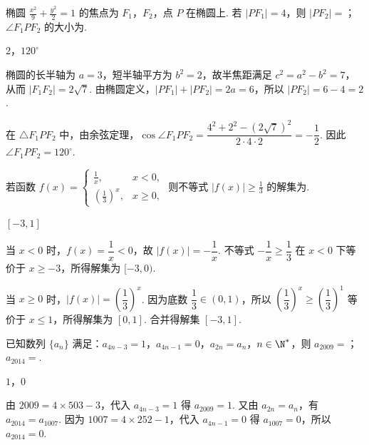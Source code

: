 \begin{problem}
椭圆 \(\frac{x^2}{9} + \frac{y^2}{2} = 1\) 的焦点为 \(F_1\)，\(F_2\)，点 \(P\) 在椭圆上. 若 \(|PF_1| = 4\)，则 \(|PF_2| = \)\fillinblank{}；\(\angle F_1PF_2\) 的大小为\fillinblank{}.

\begin{answer}
\(2\)，\(120^{\circ}\)
\end{answer}

\begin{solution}
椭圆的长半轴为 \(a=3\)，短半轴平方为 \(b^2=2\)，故半焦距满足 \(c^2=a^2-b^2=7\)，从而 \(|F_1F_2|=2\sqrt7\). 由椭圆定义，\(|PF_1|+|PF_2|=2a=6\)，所以 \(|PF_2|=6-4=2\).

在 \(\triangle F_1PF_2\) 中，由余弦定理，\(\cos\angle F_1PF_2=\dfrac{4^2+2^2-(2\sqrt7)^2}{2\cdot4\cdot2}=-\dfrac12\). 因此 \(\angle F_1PF_2=120^\circ\).
\end{solution}
\end{problem}

\begin{problem}
若函数 \( f(x) = \begin{cases}
\frac{1}{x}, & x < 0,\\
\left(\frac{1}{3}\right)^x, & x \geqslant 0,
\end{cases} \) 则不等式 \( |f(x)| \geqslant \frac{1}{3} \) 的解集为\fillinblank{}.

\begin{answer}
\([-3,1]\)
\end{answer}

\begin{solution}
当 \(x<0\) 时，\(f(x)=\dfrac1x<0\)，故 \(|f(x)|=-\dfrac1x\). 不等式 \(-\dfrac1x\geqslant\dfrac13\) 在 \(x<0\) 下等价于 \(x\geqslant-3\)，所得解集为 \([-3,0)\).

当 \(x\geqslant0\) 时，\(|f(x)|=\left(\dfrac13\right)^x\). 因为底数 \(\dfrac13\in(0,1)\)，所以 \(\left(\dfrac13\right)^x\geqslant\left(\dfrac13\right)^1\) 等价于 \(x\leqslant1\)，所得解集为 \([0,1]\). 合并得解集 \([-3,1]\).
\end{solution}
\end{problem}

\begin{problem}
已知数列 \(\{a_{n}\}\) 满足：\(a_{4n - 3} = 1\)，\(a_{4n - 1} = 0\)，\(a_{2n} = a_{n}\)，\(n \in \N^*\)，则 \(a_{2009} = \)\fillinblank{}；\(a_{2014} = \)\fillinblank{}.

\begin{answer}
\(1\)，\(0\)
\end{answer}

\begin{solution}
由 \(2009=4\times503-3\)，代入 \(a_{4n-3}=1\) 得 \(a_{2009}=1\). 又由 \(a_{2n}=a_n\)，有 \(a_{2014}=a_{1007}\). 因为 \(1007=4\times252-1\)，代入 \(a_{4n-1}=0\) 得 \(a_{1007}=0\)，所以 \(a_{2014}=0\).
\end{solution}
\end{problem}

